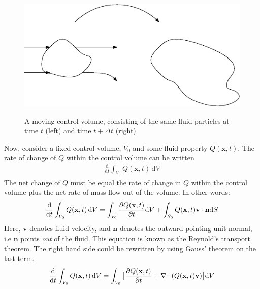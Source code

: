 \begin{center}
\begin{figure}[!ht]
\includegraphics[scale=0.8]{figures/Moving_control_volume}\\
\caption{A moving control volume, consisting of the same fluid particles at time $t$ (left) and time $t+\Delta t$ (right) }
\end{figure}
\end{center}
Now, consider a fixed control volume, $V_0$ and some fluid property $Q(\mathbf{x},t)$. The rate of change of $Q$ within the control volume can be written
\begin{align}
\frac{\mathrm{d}}{\mathrm{d}t} \int_{V_0} Q(\mathbf{x},t) \, \mathrm{d}V \label{Rate_of_change}
\end{align}
The net change of $Q$ must be equal the rate of change in $Q$ within the control volume plus the net rate of mass flow out of the volume. In other words:
\begin{align}
\frac{\mathrm{d}}{\mathrm{d}t} \int_{V_0} Q(\mathbf{x},t) \, \mathrm{d}V = \int_{V_0} \frac{\partial Q(\mathbf{x},t)}{\partial t} \mathrm{d}V + \int_{S_0} Q(\mathbf{x},t) \mathbf{v} \cdot \mathbf{n} \mathrm{d}S \label{Reynolds}
\end{align}
Here, $\mathbf{v}$ denotes fluid velocity, and $\mathbf{n}$ denotes the outward pointing unit-normal, i.e $\mathbf{n}$ points \textit{out} of the fluid. This equation is known as the Reynold's transport theorem. The right hand side could be rewritten by using Gauss' theorem on the last term. 
\begin{align}
\frac{\mathrm{d}}{\mathrm{d}t} \int_{V_0} Q(\mathbf{x},t) \, \mathrm{d}V = \int_{V_0} \big{[}\frac{\partial Q(\mathbf{x},t)}{\partial t} + \nabla \cdot (Q(\mathbf{x},t) \mathbf{v}) \big{]}\mathrm{d}V \label{Reynold}
\end{align}
